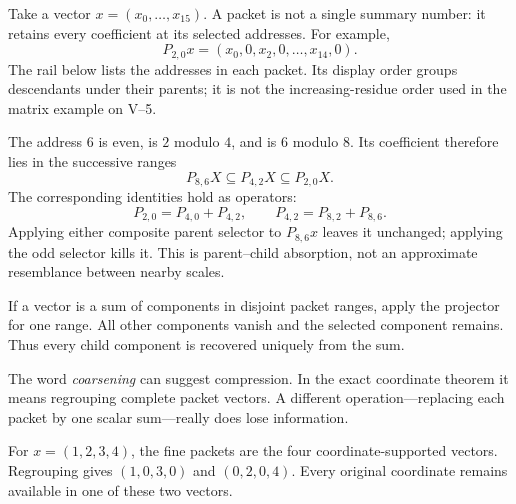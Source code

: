 Take a vector $x=(x_0,\ldots,x_{15})$. A packet is not a single summary number: it retains every coefficient at its selected addresses. For example,
\[
P_{2,0}x=(x_0,0,x_2,0,\ldots,x_{14},0).
\]
The rail below lists the addresses in each packet. Its display order groups descendants under their parents; it is not the increasing-residue order used in the matrix example on V--5.


The address $6$ is even, is $2$ modulo $4$, and is $6$ modulo $8$. Its coefficient therefore lies in the successive ranges
\[
P_{8,6}X\subseteq P_{4,2}X\subseteq P_{2,0}X.
\]
The corresponding identities hold as operators:
\[
P_{2,0}=P_{4,0}+P_{4,2},\qquad
P_{4,2}=P_{8,2}+P_{8,6}.
\]
Applying either composite parent selector to $P_{8,6}x$ leaves it unchanged; applying the odd selector kills it. This is parent--child absorption, not an approximate resemblance between nearby scales.

If a vector is a sum of components in disjoint packet ranges, apply the projector for one range. All other components vanish and the selected component remains. Thus every child component is recovered uniquely from the sum.


The word \emph{coarsening} can suggest compression. In the exact coordinate theorem it means regrouping complete packet vectors. A different operation---replacing each packet by one scalar sum---really does lose information.

For $x=(1,2,3,4)$, the fine packets are the four coordinate-supported vectors. Regrouping gives $(1,0,3,0)$ and $(0,2,0,4)$. Every original coordinate remains available in one of these two vectors.


